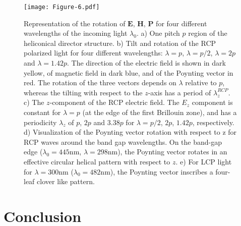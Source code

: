 \documentclass{osa-article}
\renewcommand{\vec}[1]{\mathbf{#1}}
\begin{document}
\begin{figure}[h!]
  \centering
  \texttt{[image: Figure-6.pdf]}
  \caption{Representation of the rotation of $\vec{E}$, $\vec{H}$, $\vec{P}$ for four different wavelengths of the incoming light $\lambda_0$.
  a) One pitch $p$ region of the heliconical director structure. 
  b) Tilt and rotation of the RCP polarized light for four different wavelengths: 
  $\lambda=p$, $\lambda=p/2$, $\lambda=2p$ and $\lambda=1.42p$.
  The direction of the electric field is shown in dark yellow, of magnetic field in dark blue, and of the Poynting vector in red.
  The rotation of the three vectors depends on $\lambda$ relative to $p$, whereas the tilting with respect to the $z$-axis has a period of $\lambda_z^{RCP}$. 
  c) The $z$-component of the RCP electric field. 
  The $E_z$ component is constant for $\lambda=p$ (at the edge of the first Brillouin zone), 
  and has a periodicity $\lambda_z$ of $p$, $2 p$ and $3.38p$ for $\lambda=p/2$, $2p$, $1.42p$, respectively.
  d) Visualization of the Poynting vector rotation with respect to z for RCP waves around the band gap wavelengths. 
  On the band-gap edge ($\lambda_0=445 \mathrm{nm}$, $\lambda=298\mathrm{nm}$), the Poynting vector rotates in an effective circular helical pattern with respect to $z$. 
  e) For LCP light for $\lambda=300\mathrm{nm}$ ($\lambda_0=482\mathrm{nm}$), the Poynting vector inscribes a four-leaf clover like pattern. 
  }
  \label{fig:Ez-director}
\end{figure}

\section{Conclusion}
\end{document}
